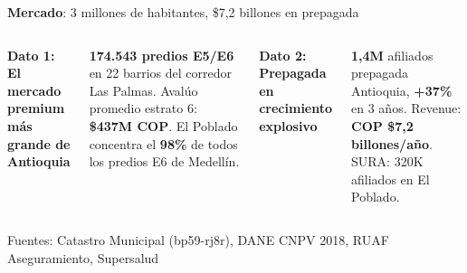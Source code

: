 \documentclass[aspectratio=169, 12pt]{beamer}
\newcommand{\eqvar}[2]{\textcolor{#1}{\textbf{#2}}}
\begin{document}
\begin{frame}{\eqvar{mercado}{Mercado}: 3 millones de habitantes, \$7,2 billones en prepagada}

\begin{columns}[T]
\vspace{-2pt}

{\footnotesize\textbf{Dato 1: El mercado premium más grande de Antioquia}}

\vspace{4pt}
{\scriptsize
\textbf{174.543 predios E5/E6} en 22 barrios del corredor Las Palmas. Avalúo promedio estrato 6: \textbf{\$437M COP}. El Poblado concentra el \textbf{98\%} de todos los predios E6 de Medellín.
}

\vspace{4pt}
{\footnotesize\textbf{Dato 2: Prepagada en crecimiento explosivo}}

\vspace{2pt}
{\scriptsize
\textbf{1,4M} afiliados prepagada Antioquia, \textbf{+37\%} en 3 años. Revenue: \textbf{COP \$7,2 billones/año}. SURA: 320K afiliados en El Poblado.
}

\end{columns}

\vspace{4pt}
{\tiny\textcolor{riesgo}{Fuentes: Catastro Municipal (bp59-rj8r), DANE CNPV 2018, RUAF Aseguramiento, Supersalud}}
\end{frame}
\end{document}
